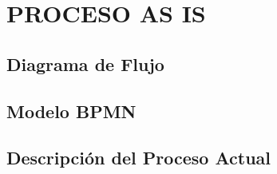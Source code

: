 \section{PROCESO AS IS}

\subsection{Diagrama de Flujo}





\subsection{Modelo BPMN}





\subsection{Descripci\'on del Proceso Actual}




